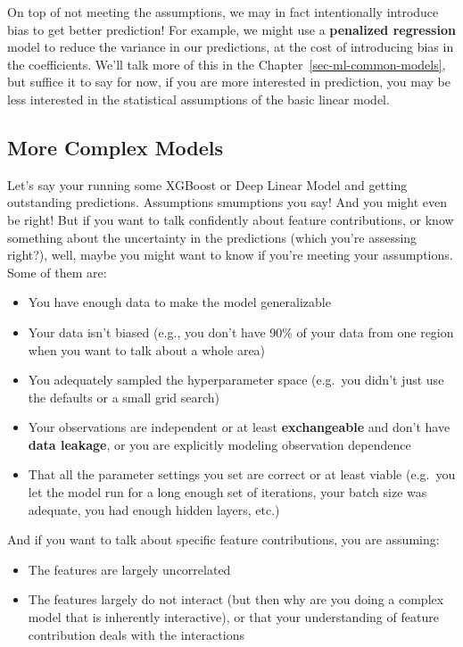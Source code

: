 \documentclass[
  letterpaper,
]{krantz}
\providecommand{\tightlist}{%
  \setlength{\itemsep}{0pt}\setlength{\parskip}{0pt}}\usepackage{longtable,booktabs,array}
\begin{document}
On top of not meeting the assumptions, we may in fact intentionally
introduce bias to get better prediction! For example, we might use a
\textbf{penalized regression} model to reduce the variance in our
predictions, at the cost of introducing bias in the coefficients. We'll
talk more of this in the Chapter~\ref{sec-ml-common-models}, but suffice
it to say for now, if you are more interested in prediction, you may be
less interested in the statistical assumptions of the basic linear
model.

\subsection{More Complex Models}\label{sec-lm-more-complex}

Let's say your running some XGBoost or Deep Linear Model and getting
outstanding predictions. Assumptions smumptions you say! And you might
even be right! But if you want to talk confidently about feature
contributions, or know something about the uncertainty in the
predictions (which you're assessing right?), well, maybe you might want
to know if you're meeting your assumptions. Some of them are:

\begin{itemize}
\tightlist
\item
  You have enough data to make the model generalizable
\item
  Your data isn't biased (e.g., you don't have 90\% of your data from
  one region when you want to talk about a whole area)
\item
  You adequately sampled the hyperparameter space (e.g.~you didn't just
  use the defaults or a small grid search)
\item
  Your observations are independent or at least \textbf{exchangeable}
  and don't have \textbf{data leakage}, or you are explicitly modeling
  observation dependence
\item
  That all the parameter settings you set are correct or at least viable
  (e.g.~you let the model run for a long enough set of iterations, your
  batch size was adequate, you had enough hidden layers, etc.)
\end{itemize}

And if you want to talk about specific feature contributions, you are
assuming:

\begin{itemize}
\tightlist
\item
  The features are largely uncorrelated
\item
  The features largely do not interact (but then why are you doing a
  complex model that is inherently interactive), or that your
  understanding of feature contribution deals with the interactions
\end{itemize}
\end{document}
